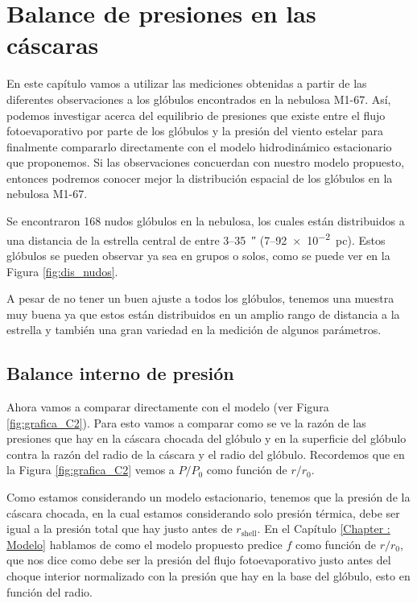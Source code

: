 \documentclass{book}
\begin{document}
\chapter{Balance de presiones en las cáscaras}\label{Ch : balance de presiones}

En este capítulo vamos a utilizar las mediciones obtenidas a partir de
las diferentes observaciones a los glóbulos encontrados en la nebulosa
M1-67. Así, podemos investigar acerca del equilibrio de presiones que
existe entre el flujo fotoevaporativo por parte de los glóbulos y la
presión del viento estelar para finalmente compararlo directamente con
el modelo hidrodinámico estacionario que proponemos. Si las
observaciones concuerdan con nuestro modelo propuesto, entonces
podremos conocer mejor la distribución espacial de los glóbulos en la
nebulosa M1-67.

Se encontraron 168 nudos glóbulos en la nebulosa, los cuales están
distribuidos a una distancia de la estrella central de entre
3--\SI{35}{\arcsecond} (7--\SI{92e-2}{pc}). Estos glóbulos se pueden
observar ya sea en grupos o solos, como se puede ver en la Figura
\ref{fig:dis_nudos}.

A pesar de no tener un buen ajuste a todos los glóbulos, tenemos una
muestra muy buena ya que estos están distribuidos en un amplio rango
de distancia a la estrella y también una gran variedad en la medición
de algunos parámetros.

\section{Balance interno de presión}\label{Sec : comparacion-modelo}

Ahora vamos a comparar directamente con el modelo (ver Figura
\ref{fig:grafica_C2}). Para esto vamos a comparar como se ve la razón
de las presiones que hay en la cáscara chocada del glóbulo y en la
superficie del glóbulo contra la razón del radio de la cáscara y el
radio del glóbulo. Recordemos que en la Figura \ref{fig:grafica_C2}
vemos a $P/P_0$ como función de $r/r_0$.

Como estamos considerando un modelo estacionario, tenemos que la
presión de la cáscara chocada, en la cual estamos considerando solo
presión térmica, debe ser igual a la presión total que hay justo antes
de $r_\mathrm{shell}$. En el Capítulo \ref{Chapter : Modelo} hablamos
de como el modelo propuesto predice $f$ como función de $r/r_0$, que
nos dice como debe ser la presión del flujo fotoevaporativo justo
antes del choque interior normalizado con la presión que hay en la
base del glóbulo, esto en función del radio.
\end{document}
